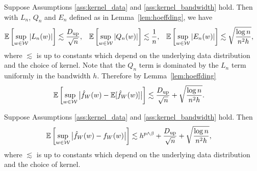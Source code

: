 \begin{lemma}
  \label{lem:uniform_concentration}

  Suppose Assumptions
  \ref{ass:kernel_data}
  and
  \ref{ass:kernel_bandwidth}
  hold.
  Then with $L_n$, $Q_n$ and $E_n$ defined as in
  Lemma~\ref{lem:hoeffding},
  we have
  \begin{align*}
    \mathbb{E}\left[ \sup_{w \in \mathcal{W}} |L_n(w)| \right]
    &\lesssim
    \frac{D_{\textup{up}}}{\sqrt n},
    &\mathbb{E}\left[ \sup_{w \in \mathcal{W}} |Q_n(w)| \right]
    &\lesssim
    \frac{1}{n},
    &\mathbb{E}\left[ \sup_{w \in \mathcal{W}} |E_n(w)| \right]
    &\lesssim
    \sqrt{\frac{\log n}{n^2h}},
  \end{align*}
  where $\lesssim$ is up to constants which
  depend on the underlying data distribution
  and the choice of kernel.
  Note that the $Q_n$
  term is dominated by the $L_n$
  term uniformly in the bandwidth $h$.
  Therefore by Lemma~\ref{lem:hoeffding}
  \begin{align*}
    \mathbb{E}\left[
      \sup_{w \in \mathcal{W}}
      \big|\hat f_W(w) - \mathbb{E}[\hat f_W(w)]\big|
    \right]
    &\lesssim
    \frac{D_{\textup{up}}}{\sqrt n}
    + \sqrt{\frac{\log n}{n^2h}}.
  \end{align*}

\end{lemma}

\begin{theorem}
  \label{thm:app_uniform_consistency}

  Suppose Assumptions \ref{ass:kernel_data}
  and \ref{ass:kernel_bandwidth} hold. Then
  \begin{align*}
    \mathbb{E}\left[
      \sup_{w \in \mathcal{W}}
      \big|\hat f_W(w) - f_W(w)\big|
    \right]
    &\lesssim
    h^{p \wedge \beta}
    + \frac{D_{\textup{up}}}{\sqrt n}
    + \sqrt{\frac{\log n}{n^2h}},
  \end{align*}
  where $\lesssim$ is up to constants which
  depend on the underlying data distribution
  and the choice of kernel.

\end{theorem}

